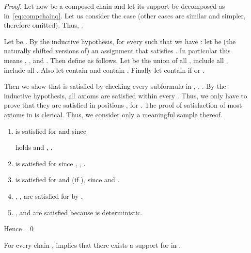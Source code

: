 \documentclass[10pt,a4paper,runningheads]{llncs}
\begin{document}
\begin{proof}
Let now  be a composed chain and let its support be decomposed as
in~\eqref{eq:compchainq}. 
Let us consider the case  (other cases are similar and simpler, therefore
omitted). Thus, .

Let  be . By the inductive hypothesis,  for every  such that  we have
: let  be (the naturally shifted versions of) an assignment that satisfies .
In particular this means , , and .
Then define  as follows.  
Let  be the union of all ,
 include all ,
 include all .
Also let  contain 
and  contain .
Finally  let  contain  if  or .

Then  we show that   is satisfied
by checking every subformula in ,
, .
By the inductive hypothesis, all axioms are satisfied within every
. Thus, we only have to prove that they are satisfied in
positions , for .
The proof of satisfaction of most axioms in  is
clerical. Thus, we consider only a meaningful sample thereof.

\begin{enumerate}

\item  is satisfied for  and  since

holds and , .


\item  is satisfied
for  since , ,  
.

\item   is satisfied for  and  (if ), since  and . 

\item , ,
   are satisfied for  by .


\item , and  are
  satisfied because  is deterministic.

\end{enumerate}

\noindent Hence . \qed
\end{proof}



\begin{lemma}\label{lem:f2a}
For every chain ,  implies that there exists a support 
 for  in .
\end{lemma}
\end{document}

